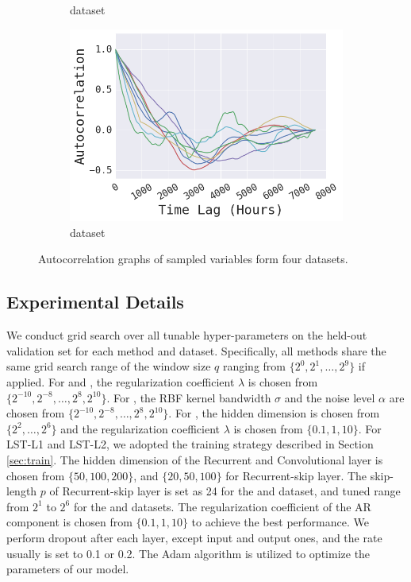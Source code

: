 \begin{figure}[!ht]
\begin{subfigure}{.23\textwidth}
  \caption{\electricity dataset}
\end{subfigure}
\begin{subfigure}{.23\textwidth}
  \centering
  \includegraphics[width=\linewidth]{fig-auto/autocorr_exchange.png}
  \caption{\exchange dataset}
\end{subfigure}
\caption{Autocorrelation graphs of sampled variables form four datasets.}
\label{fig:autocorrelation}
\end{figure}




\subsection{Experimental Details}
We conduct grid search over all tunable hyper-parameters on the held-out validation set for each method and dataset. Specifically, all methods share the same grid search range of the window size $q$ ranging from $\{2^0,2^1,\ldots,2^9\}$ if applied. For \LRidge and \LSVR, the regularization coefficient $\lambda$ is chosen from $\{2^{-10}, 2^{-8}, \ldots, 2^{8}, 2^{10}\}$. For \GP, the RBF kernel bandwidth $\sigma$ and the noise level $\alpha$ are chosen from $\{2^{-10}, 2^{-8}, \ldots, 2^{8}, 2^{10}\}$. For \TRMF, the hidden dimension is chosen from $\{2^2, \ldots, 2^6\}$ and the regularization coefficient $\lambda$ is chosen from $\{0.1, 1, 10\}$.  For LST-L1 and LST-L2, we adopted the training strategy described in Section \ref{sec:train}. The hidden dimension of the Recurrent and Convolutional layer is chosen from $\{50,100,200\}$, and $\{20,50,100\}$ for Recurrent-skip layer. The skip-length $p$ of Recurrent-skip layer is set as 24 for the \traffic and \electricity dataset, and tuned range from $2^1$ to $2^6$ for the \solar and \exchange datasets. The regularization coefficient of the AR component is chosen from $\{0.1,1,10\}$ to achieve the best performance. We perform dropout after each layer, except input and output ones, and the rate usually is set to 0.1 or 0.2. The Adam\cite{kingma2014adam} algorithm is utilized to optimize the parameters of our model.


